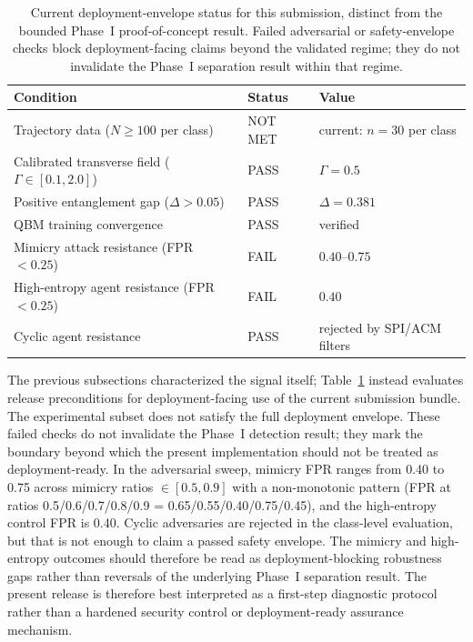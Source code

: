 \documentclass[11pt]{article}
\begin{document}
	\begin{table}[t]
		\centering
		\caption{Current deployment-envelope status for this submission, distinct from the bounded Phase~I proof-of-concept result. Failed adversarial or safety-envelope checks block deployment-facing claims beyond the validated regime; they do not invalidate the Phase~I separation result within that regime.}
		\label{tab:safety}
		\begin{tabular}{lll}
			\toprule
			Condition & Status & Value \\
			\midrule
			Trajectory data ($N \geq 100$ per class) & NOT MET & current: $n = 30$ per class \\
			Calibrated transverse field ($\Gamma \in [0.1, 2.0]$) & PASS & $\Gamma = 0.5$ \\
			Positive entanglement gap ($\Delta > 0.05$) & PASS & $\Delta = 0.381$ \\
			QBM training convergence & PASS & verified \\
			Mimicry attack resistance (FPR $< 0.25$) & FAIL & $0.40$--$0.75$ \\
			High-entropy agent resistance (FPR $< 0.25$) & FAIL & $0.40$ \\
			Cyclic agent resistance & PASS & rejected by SPI/ACM filters \\
			\bottomrule
		\end{tabular}
	\end{table}
	
	The previous subsections characterized the signal itself; Table~\ref{tab:safety}
	instead evaluates release preconditions for deployment-facing use of the
	current submission bundle. The experimental subset
	does not satisfy the full deployment envelope. These failed checks do not
	invalidate the Phase~I detection result; they mark the boundary beyond
	which the present implementation should not be treated as deployment-ready.
	In the adversarial sweep, mimicry FPR ranges from 0.40 to 0.75 across
	mimicry ratios $\in [0.5, 0.9]$ with a non-monotonic pattern (FPR at ratios
	0.5/0.6/0.7/0.8/0.9 = 0.65/0.55/0.40/0.75/0.45), and the high-entropy control
	FPR is 0.40. Cyclic adversaries are rejected in the class-level
	evaluation, but that is not enough to claim a passed safety envelope. The
	mimicry and high-entropy outcomes should therefore be read as
	deployment-blocking robustness gaps rather than reversals of the underlying
	Phase~I separation result. The present release is therefore best interpreted
	as a first-step diagnostic protocol rather than a hardened security control or
	deployment-ready assurance mechanism.
	
\end{document}
